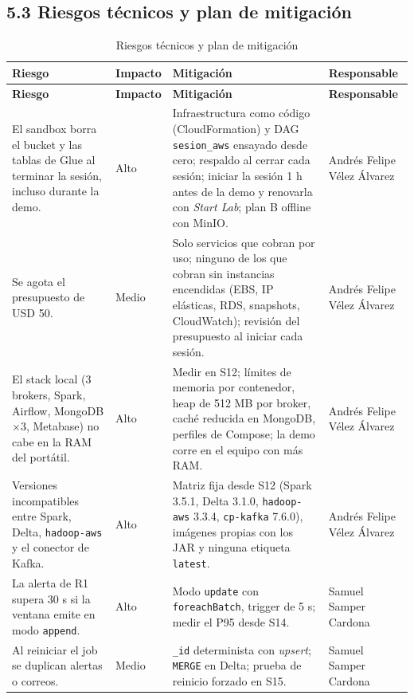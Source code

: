 \documentclass[12pt,letterpaper]{article}
\newcommand{\code}[1]{{\small\texttt{#1}}}
\begin{document}
\subsection*{5.3 Riesgos técnicos y plan de mitigación}

\begin{footnotesize}
\setlength{\LTpre}{4pt}\setlength{\LTleft}{0pt}\setlength{\LTpost}{2pt}
\setlength{\tabcolsep}{4pt}
\begin{longtable}{@{}P{1.95in}P{0.5in}P{2.85in}P{1.05in}@{}}
\caption{Riesgos técnicos y plan de mitigación}\\
\toprule
\textbf{Riesgo} & \textbf{Impacto} & \textbf{Mitigación} & \textbf{Responsable}\\
\midrule
\endfirsthead
\toprule
\textbf{Riesgo} & \textbf{Impacto} & \textbf{Mitigación} & \textbf{Responsable}\\
\midrule
\endhead
\bottomrule
\endlastfoot
El sandbox borra el bucket y las tablas de Glue al terminar la sesión, incluso durante la demo. & Alto & Infraestructura como código (CloudFormation) y DAG \code{sesion\_aws} ensayado desde cero; respaldo al cerrar cada sesión; iniciar la sesión 1 h antes de la demo y renovarla con \emph{Start Lab}; plan B offline con MinIO. & Andrés Felipe Vélez Álvarez\\[1pt]
Se agota el presupuesto de USD 50. & Medio & Solo servicios que cobran por uso; ninguno de los que cobran sin instancias encendidas (EBS, IP elásticas, RDS, snapshots, CloudWatch); revisión del presupuesto al iniciar cada sesión. & Andrés Felipe Vélez Álvarez\\[1pt]
El stack local (3 brokers, Spark, Airflow, MongoDB $\times$3, Metabase) no cabe en la RAM del portátil. & Alto & Medir en S12; límites de memoria por contenedor, heap de 512 MB por broker, caché reducida en MongoDB, perfiles de Compose; la demo corre en el equipo con más RAM. & Andrés Felipe Vélez Álvarez\\[1pt]
Versiones incompatibles entre Spark, Delta, \code{hadoop-aws} y el conector de Kafka. & Alto & Matriz fija desde S12 (Spark 3.5.1, Delta 3.1.0, \code{hadoop-aws} 3.3.4, \code{cp-kafka} 7.6.0), imágenes propias con los JAR y ninguna etiqueta \code{latest}. & Andrés Felipe Vélez Álvarez\\[1pt]
La alerta de R1 supera 30 s si la ventana emite en modo \code{append}. & Alto & Modo \code{update} con \code{foreachBatch}, trigger de 5 s; medir el P95 desde S14. & Samuel Samper Cardona\\[1pt]
Al reiniciar el job se duplican alertas o correos. & Medio & \code{\_id} determinista con \emph{upsert}; \code{MERGE} en Delta; prueba de reinicio forzado en S15. & Samuel Samper Cardona\\[1pt]

\end{longtable}
\end{footnotesize}
\end{document}
